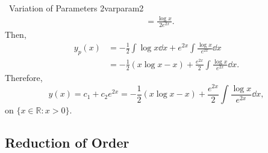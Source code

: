 \begin{example}{\Difficulty\,\Difficulty\,\,Variation of Parameters 2}{varparam2}
\begin{align*}
                &=\frac{\log x}{2e^{2x}}.
            \end{align*}
            Then,
            \begin{align*}
                y_p(x)&=-\frac{1}{2}\int \log x \dd x+e^{2x}\int \frac{\log x}{e^{2x}}\dd x \\
                &=-\frac{1}{2}\left(x\log x-x\right)+\frac{e^{2x}}{2}\int \frac{\log x}{e^{2x}}\dd x.
            \end{align*}
            Therefore,
            \begin{equation*}
                y(x)=c_1+c_2e^{2x}=-\frac{1}{2}\left(x\log x-x\right)+\frac{e^{2x}}{2}\int \frac{\log x}{e^{2x}}\dd x,
            \end{equation*}
            on \(\{x\in\mathbb{R}:x>0\}\).

        \end{example}

    \subsection{Reduction of Order}

